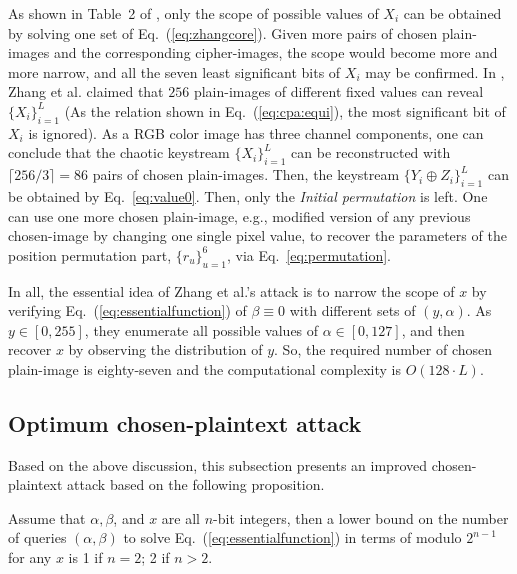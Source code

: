 \documentclass{ws-ijbc}
\begin{document}
As shown in Table~2 of \cite{Cqli:breakmodulo:IJBC13}, only the scope of possible values of $X_{i}$
can be obtained by solving one set of Eq.~(\ref{eq:zhangcore}). Given more pairs of chosen plain-images
and the corresponding cipher-images, the scope would become more and more narrow, and all the seven least significant
bits of $X_i$ may be confirmed. In \cite{Zhang:Cryptanalyzing:MTA2014}, Zhang et al. claimed that $256$ plain-images of different fixed values can reveal
$\{X_{i}\}_{i=1}^{L}$ (As the relation shown in Eq.~(\ref{eq:cpa:equi}), the most significant bit of $X_{i}$ is ignored). As a RGB color image has three channel components,
one can conclude that the chaotic keystream $\{X_{i}\}_{i=1}^{L}$ can
be reconstructed with $\lceil 256/3\rceil = 86$ pairs of chosen
plain-images. Then, the keystream
$\{Y_{i}\oplus Z_{i}\}_{i=1}^{L}$ can be obtained by Eq.~\eqref{eq:value0}.
Then, only the \textit{Initial permutation} is left. One can use one more chosen plain-image, e.g., modified version of any previous chosen-image by
changing one single pixel value, to recover the parameters of the position permutation part, $\{r_u\}_{u=1}^{6}$,
via Eq.~\eqref{eq:permutation}.

In all, the essential idea of Zhang et al.'s attack is to narrow the scope of
$x$ by verifying Eq.~(\ref{eq:essentialfunction}) of $\beta\equiv 0$ with different sets of $(y, \alpha)$.
As $y \in [0, 255]$, they enumerate all possible values
of $\alpha \in [0, 127]$, and then recover $x$ by observing the distribution of $y$.
So, the required number of chosen plain-image is eighty-seven
and the computational complexity is $O(128 \cdot L)$.

\subsection{Optimum chosen-plaintext attack}
\label{ssec:ocpa}

Based on the above discussion, this subsection presents an improved chosen-plaintext attack
based on the following proposition.
\begin{proposition}
Assume that $\alpha, \beta$, and $x$ are all $n$-bit integers, then a lower bound on the number of queries $(\alpha, \beta)$ to solve
Eq.~(\ref{eq:essentialfunction}) in terms of modulo $2^{n-1}$ for any $x$ is 1 if $n=2$; 2 if $n>2$.
\end{proposition}
\end{document}
